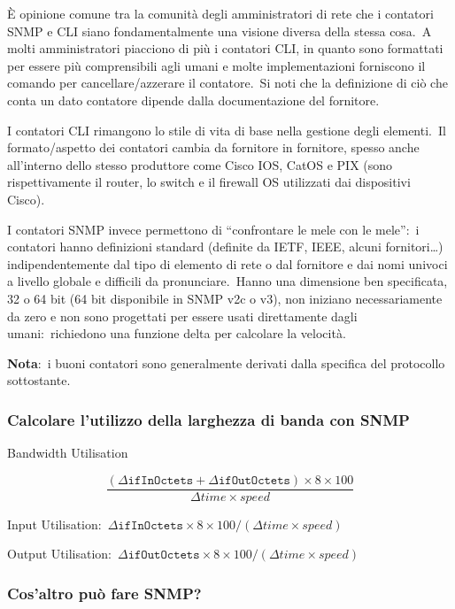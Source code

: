 È opinione comune tra la comunità degli amministratori di rete che i contatori SNMP e CLI siano fondamentalmente una visione diversa della stessa cosa.\
A molti amministratori piacciono di più i contatori CLI, in quanto sono formattati per essere più comprensibili agli umani e molte implementazioni forniscono il comando per cancellare/azzerare il contatore.\
Si noti che la definizione di ciò che conta un dato contatore dipende dalla documentazione del fornitore.

I contatori CLI rimangono lo stile di vita di base nella gestione degli elementi.\
Il formato/aspetto dei contatori cambia da fornitore in fornitore, spesso anche all'interno dello stesso produttore come Cisco IOS, CatOS e PIX (sono rispettivamente il router, lo switch e il firewall OS utilizzati dai dispositivi Cisco).\

I contatori SNMP invece permettono di ``confrontare le mele con le mele'':\ i contatori hanno definizioni standard (definite da IETF, IEEE, alcuni fornitori\dots) indipendentemente dal tipo di elemento di rete o dal fornitore e dai nomi univoci a livello globale e difficili da pronunciare.\
Hanno una dimensione ben specificata, 32 o 64 bit (64 bit disponibile in SNMP v2c o v3), non iniziano necessariamente da zero e non sono progettati per essere usati direttamente dagli umani:\ richiedono una funzione delta per calcolare la velocità.\

\textbf{Nota}:\ i buoni contatori sono generalmente derivati dalla specifica del protocollo sottostante.

\subsubsection{Calcolare l'utilizzo della larghezza di banda con SNMP}

Bandwidth Utilisation

\[
    \frac{(\mathtt{\Delta ifInOctets + \Delta ifOutOctets}) \times 8 \times 100}{\mathit{\Delta time \times speed}}
\]

\noindent Input Utilisation:\ $\mathtt{\Delta ifInOctets} \times 8 \times 100/(\mathit{\Delta time \times speed})$

\noindent Output Utilisation:\ $\mathtt{\Delta ifOutOctets} \times 8 \times 100/(\mathit{\Delta time \times speed})$

\subsubsection{Cos'altro può fare SNMP?}

